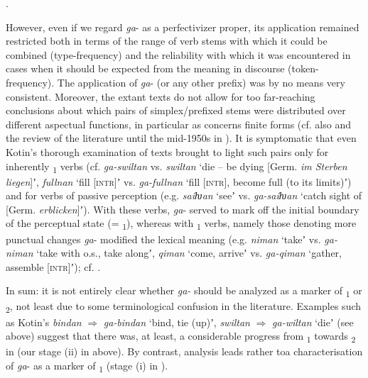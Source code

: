 \documentclass[output=paper]{langsci/langscibook}
\begin{document}
.

However, even if we regard \textit{ga}- as a perfectivizer proper, its application remained restricted both in terms of the range of verb stems with which it could be combined (type-frequency) and the reliability with which it was encountered in cases when it should be expected from the meaning in discourse (token-fre\-quen\-cy). The application of \textit{ga}- (or any other prefix) was by no means very consistent. Moreover, the extant texts do not allow for too far-reaching conclusions about which pairs of simplex/prefixed stems were distributed over different aspectual functions, in particular as concerns finite forms (cf. also \citealt[250f.]{West1981-1982} and the review of the literature until the mid-1950s in \citealt{Maslov1959}). It is symptomatic that even Kotin’s thorough examination of  texts brought to light such pairs only for inherently \textsubscript{1} verbs (cf. \textit{ga-swiltan} vs. \textit{swiltan} ‘die – be dying [Germ. \textit{im Sterben liegen}]ʼ, \textit{fullnan} ‘fill [\textsc{intr]}ʼ vs. \textit{ga-fullnan} ‘fill [\textsc{intr]}, become full (to its limits)ʼ) and for verbs of passive perception (e.g. \textit{saíƕan} ‘seeʼ vs. \textit{ga-saíƕan} ‘catch sight of [Germ. \textit{erblicken}]ʼ). With these verbs, \textit{ga}- served to mark off the initial boundary of the perceptual state (= \textsubscript{1}), whereas with \textsubscript{1} verbs, namely those denoting more punctual changes \textit{ga}- modified the lexical meaning (e.g. \textit{niman} ‘takeʼ vs. \textit{ga-niman} ‘take with o.s., take alongʼ, \textit{qiman} ‘come, arriveʼ vs. \textit{ga-qiman} ‘gather, assemble [\textsc{intr]}ʼ); cf. \citet[294--300, 395--397]{Kotin2012}. 

In sum: it is not entirely clear whether  \textit{ga-} should be analyzed as a marker of \textsubscript{1} or \textsubscript{2}, not least due to some terminological confusion in the literature. Examples such as Kotin’s \textit{bindan} ${\Rightarrow}$ \textit{ga-bindan} ‘bind, tie (up)ʼ, \textit{swiltan} ${\Rightarrow}$ \textit{ga-wiltan} ‘dieʼ (see above) suggest that there was, at least, a considerable progress from \textsubscript{1} towards \textsubscript{2} in  (our stage (ii) in  above).{} By contrast,  analysis leads rather to\largerpage a characterisation of \textit{ga}- as a marker of \textsubscript{1} (stage (i) in ).
\end{document}
